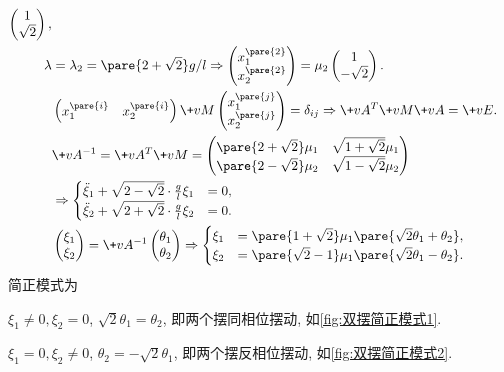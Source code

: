 \documentclass{ctexart}
\begin{document}
\begin{sample}
\begin{ex}
\begin{align*}
\begin{pmatrix}
                1 \\ \sqrt{2}
            \end{pmatrix}, \\
            \lambda &= \lambda_2 = \pare{2+\sqrt{2}}g/l \Rightarrow \begin{pmatrix}
                x_1^{\pare{2}} \\ x_2^{\pare{2}}
            \end{pmatrix} = \mu_2 \begin{pmatrix}
                1 \\ -\sqrt{2}
            \end{pmatrix}. \\
            &\begin{pmatrix}
                x_1^{\pare{i}} & x_2^{\pare{i}}
            \end{pmatrix} \+vM \begin{pmatrix}
                x_1^{\pare{j}} \\ x_2^{\pare{j}}
            \end{pmatrix} = \delta_{ij} \Rightarrow \+vA^T \+vM\+vA = \+vE. \\
            &\+vA^{-1} = \+vA^T \+vM = \begin{pmatrix}
                \pare{2+\sqrt{2}} \mu_1 & \sqrt{1+\sqrt{2}}\mu_1 \\
                \pare{2-\sqrt{2}}\mu_2 & \sqrt{1-\sqrt{2}} \mu_2
            \end{pmatrix} \\ &\Rightarrow \begin{cases}
                \ddot{\xi}_1 + \sqrt{2-\sqrt{2}} \cdot \frac{g}{l} \xi_1 &= 0, \\
                \ddot{\xi}_2 + \sqrt{2+\sqrt{2}} \cdot \frac{g}{l} \xi_2 &= 0.
            \end{cases}\\
            & \begin{pmatrix}
                \xi_1 \\ \xi_2
            \end{pmatrix} = \+vA^{-1} \begin{pmatrix}
                \theta_1 \\ \theta_2
            \end{pmatrix} \Rightarrow \begin{cases}
                \xi_1 &= \pare{1+\sqrt{2}} \mu_1\pare{\sqrt{2}\theta_1 + \theta_2}, \\
                \xi_2 &= \pare{\sqrt{2}-1} \mu_1\pare{\sqrt{2}\theta_1 - \theta_2}.
            \end{cases}
        \end{align*}
        简正模式为
        \begin{cenum}
            \item $\xi_1 \neq 0, \xi_2 = 0$, $\sqrt{2}\theta_1 = \theta_2$, 即两个摆同相位摆动, 如\cref{fig:双摆简正模式1}.
            \item $\xi_1 = 0, \xi_2 \neq 0$, $\theta_2 = -\sqrt{2}\theta_1$, 即两个摆反相位摆动, 如\cref{fig:双摆简正模式2}.
        \end{cenum}
    \end{ex}
\end{sample}
\end{document}
